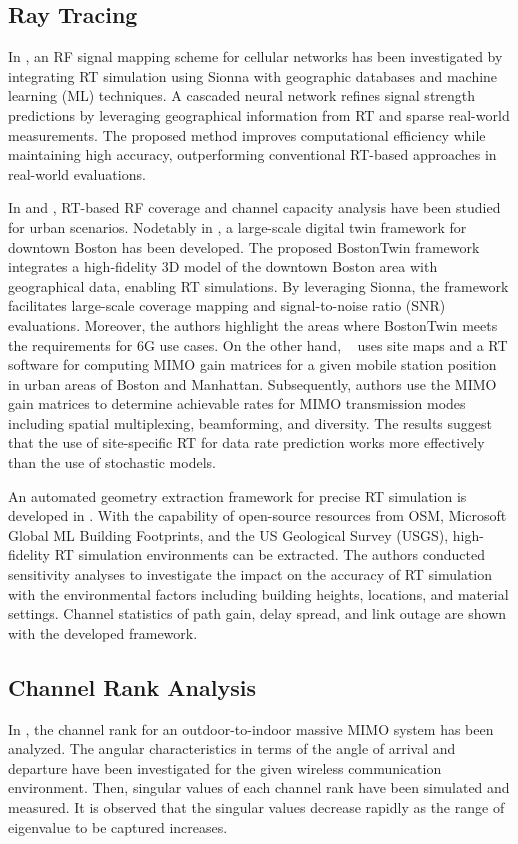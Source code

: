 \subsection{Ray Tracing}
In \cite{duke_sionna_paper}, an RF signal mapping scheme for cellular networks has been investigated by integrating RT simulation using Sionna with geographic databases and machine learning (ML) techniques. A cascaded neural network refines signal strength predictions by leveraging geographical information from RT and sparse real-world measurements. The proposed method improves computational efficiency while maintaining high accuracy, outperforming conventional RT-based approaches in real-world evaluations.

In \cite{boston_sionna} and \cite{RT_mode_urban}, RT-based RF coverage and channel capacity analysis have been studied for urban scenarios. Nodetably in \cite{boston_sionna}, a large-scale digital twin framework for downtown Boston has been developed. The proposed BostonTwin framework integrates a high-fidelity 3D model of the downtown Boston area with geographical data, enabling RT simulations. By leveraging Sionna, the framework facilitates large-scale coverage mapping and signal-to-noise ratio (SNR) evaluations. Moreover, the authors highlight the areas where BostonTwin meets the requirements for 6G use cases. On the other hand, ~\cite{RT_mode_urban} uses site maps and a RT software for computing MIMO gain matrices for a given mobile station position in urban areas of Boston and Manhattan. Subsequently, authors use the MIMO gain matrices to determine achievable rates for MIMO transmission modes including spatial multiplexing, beamforming, and diversity. The results suggest that the use of site-specific RT for data rate prediction works more effectively than the use of stochastic models.

An automated geometry extraction framework for precise RT simulation is developed in \cite{openGERT_paper}. With the capability of open-source resources from OSM, Microsoft Global ML Building Footprints, and the US Geological Survey (USGS), high-fidelity RT simulation environments can be extracted. The authors conducted sensitivity analyses to investigate the impact on the accuracy of RT simulation with the environmental factors including building heights, locations, and material settings. Channel statistics of path gain, delay spread, and link outage are shown with the developed framework. 


\subsection{Channel Rank Analysis}
In \cite{Channel_rank_massive_MIMO}, the channel rank for an outdoor-to-indoor massive MIMO system has been analyzed. The angular characteristics in terms of the angle of arrival and departure have been investigated for the given wireless communication environment. Then, singular values of each channel rank have been simulated and measured. It is observed that the singular values decrease rapidly as the range of eigenvalue to be captured increases. 

